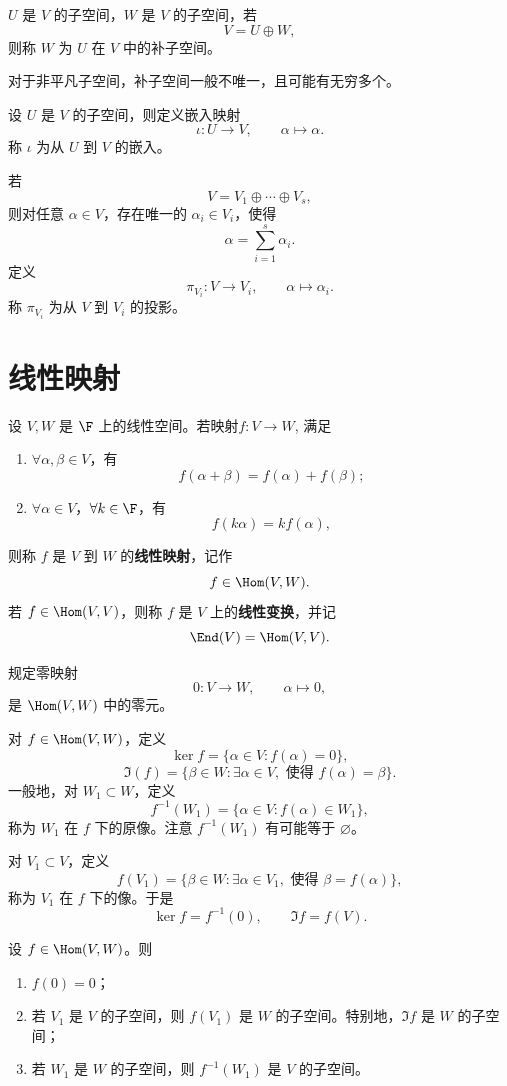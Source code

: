 \begin{definition}
	$U$ 是 $V$ 的子空间，$W$ 是 $V$ 的子空间，若
	\[
	V=U\oplus W,
	\]
	则称 $W$ 为 $U$ 在 $V$ 中的补子空间。
\end{definition}

对于非平凡子空间，补子空间一般不唯一，且可能有无穷多个。

\begin{definition}
	设 $U$ 是 $V$ 的子空间，则定义嵌入映射
	\[
	\iota:U\longrightarrow V,
	\qquad
	\alpha\longmapsto \alpha.
	\]
	称 $\iota$ 为从 $U$ 到 $V$ 的嵌入。
	
	若
	\[
	V=V_1\oplus\cdots\oplus V_s,
	\]
	则对任意 $\alpha\in V$，存在唯一的 $\alpha_i\in V_i$，使得
	\[
	\alpha=\sum_{i=1}^{s}\alpha_i.
	\]
	定义
	\[
	\pi_{V_i}:V\longrightarrow V_i,
	\qquad
	\alpha\longmapsto \alpha_i.
	\]
	称 $\pi_{V_i}$ 为从 $V$ 到 $V_i$ 的投影。
\end{definition}
\section{线性映射}
\begin{definition}
	设 $V,W$ 是 $\F$ 上的线性空间。若映射$f:V\longrightarrow W$,
	满足
	\begin{enumerate}
		\item $\forall \alpha,\beta\in V$，有
		\[
		f(\alpha+\beta)=f(\alpha)+f(\beta);
		\]
		\item $\forall \alpha\in V$，$\forall k\in\F$，有
		\[
		f(k\alpha)=k f(\alpha),
		\]
	\end{enumerate}
	则称 $f$ 是 $V$ 到 $W$ 的\textbf{线性映射}，记作
	\[
	f\in\Hom(V,W).
	\]
	若 $f\in\Hom(V,V)$，则称 $f$ 是 $V$ 上的\textbf{线性变换}，并记
	\[
	\End(V)=\Hom(V,V).
	\]
\end{definition}

规定零映射
\[
0:V\longrightarrow W,
\qquad
\alpha\longmapsto 0,
\]
是 $\Hom(V,W)$ 中的零元。

对 $f\in\Hom(V,W)$，定义
\[
\ker f=\{\alpha\in V:f(\alpha)=0\},
\]
\[
\Im(f)=\{\beta\in W:\exists\alpha\in V,\text{ 使得 }f(\alpha)=\beta\}.
\]
一般地，对 $W_1\subset W$，定义
\[
f^{-1}(W_1)=\{\alpha\in V:f(\alpha)\in W_1\},
\]
称为 $W_1$ 在 $f$ 下的原像。注意 $f^{-1}(W_1)$ 有可能等于 $\varnothing$。

对 $V_1\subset V$，定义
\[
f(V_1)=\{\beta\in W:\exists\alpha\in V_1,\text{ 使得 }\beta=f(\alpha)\},
\]
称为 $V_1$ 在 $f$ 下的像。于是
\[
\ker f=f^{-1}(0),
\qquad
\Im f=f(V).
\]

\begin{proposition}
	设 $f\in\Hom(V,W)$。则
	\begin{enumerate}
		\item $f(0)=0$；
		\item 若 $V_1$ 是 $V$ 的子空间，则 $f(V_1)$ 是 $W$ 的子空间。特别地，$\Im f$ 是 $W$ 的子空间；
		\item 若 $W_1$ 是 $W$ 的子空间，则 $f^{-1}(W_1)$ 是 $V$ 的子空间。
	\end{enumerate}
\end{proposition}


